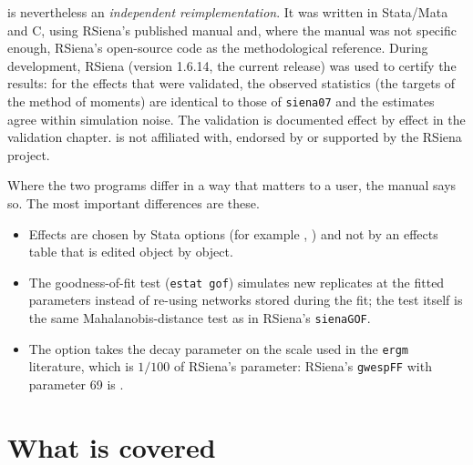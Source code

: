 \nwsaom{} is nevertheless an \emph{independent reimplementation}. It was written in Stata/Mata and C, using RSiena's published manual and, where the manual was not specific enough, RSiena's open-source code as the methodological reference. During development, RSiena (version 1.6.14, the current release) was used to certify the results: for the effects that were validated, the observed statistics (the targets of the method of moments) are identical to those of \texttt{siena07} and the estimates agree within simulation noise. The validation is documented effect by effect in the validation chapter. \nwsaom{} is not affiliated with, endorsed by or supported by the RSiena project.

Where the two programs differ in a way that matters to a user, the manual says so. The most important differences are these.
\begin{itemize}[nosep]
  \item Effects are chosen by Stata options (for example , ) and not by an effects table that is edited object by object.
  \item The goodness-of-fit test (\texttt{estat gof}) simulates new replicates at the fitted parameters instead of re-using networks stored during the fit; the test itself is the same Mahalanobis-distance test as in RSiena's \texttt{sienaGOF}.
  \item The option  takes the decay parameter on the scale used in the \texttt{ergm} literature, which is $1/100$ of RSiena's parameter: RSiena's \texttt{gwespFF} with parameter 69 is .
\end{itemize}

\section{What is covered}

